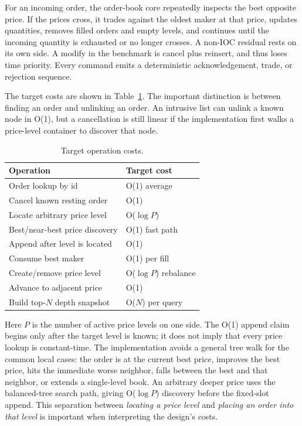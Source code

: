 \documentclass[10pt,twocolumn]{article}
\begin{document}


For an incoming order, the order-book core repeatedly inspects the best opposite price.
If the prices cross, it trades against the oldest maker at that price, updates
quantities, removes filled orders and empty levels, and continues until the
incoming quantity is exhausted or no longer crosses.  A non-IOC residual rests
on its own side.  A modify in the benchmark is cancel plus reinsert, and thus
loses time priority.  Every command emits a deterministic acknowledgement,
trade, or rejection sequence.

The target costs are shown in Table~\ref{tab:costs}.  The important distinction
is between finding an order and unlinking an order.  An intrusive list can unlink
a known node in O(1), but a cancellation is still linear if the implementation first
walks a price-level container to discover that node.

\begin{table}[h]
\centering
\caption{Target operation costs.}
\label{tab:costs}
\small
\begin{tabular}{@{}ll@{}}
\toprule
Operation & Target cost \\
\midrule
Order lookup by id & O(1) average \\
Cancel known resting order & O(1) \\
Locate arbitrary price level & O($\log P$) \\
Best/near-best price discovery & O(1) fast path \\
Append after level is located & O(1) \\
Consume best maker & O(1) per fill \\
Create/remove price level & O($\log P$) rebalance \\
Advance to adjacent price & O(1) \\
Build top-$N$ depth snapshot & O($N$) per query \\
\bottomrule
\end{tabular}
\end{table}

Here $P$ is the number of active price levels on one side.  The O(1) append
claim begins only after the target level is known; it does not imply that every
price lookup is constant-time.  The implementation avoids a general tree walk
for the common local cases: the order is at the current best price, improves the
best price, hits the immediate worse neighbor, falls between the best and that
neighbor, or extends a single-level book.  An arbitrary deeper price uses the
balanced-tree search path, giving O($\log P$) discovery before the fixed-slot
append.  This separation between \emph{locating a price level} and \emph{placing
an order into that level} is important when interpreting the design's costs.
\end{document}
